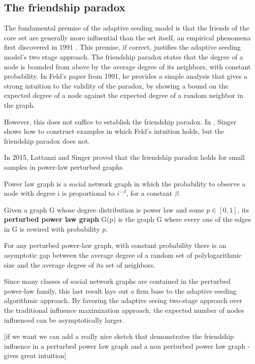 \subsection{The friendship paradox}

The fundamental premise of the adaptive seeding model is that the friends
 of the core set are generally more influential than the set itself, an empirical
 phenomena first discovered in 1991 \cite{feld1991your}.
 This premise, if correct, justifies the adaptive seeding model's two stage
 approach.
 The friendship paradox states that the degree of a node is bounded from
 above by the average degree of its neighbors, with constant probability.
 In Feld's paper from 1991, he provides a simple analysis that gives a strong
 intuition to the validity of the paradox, by showing a bound on the expected
 degree of a node against the expected degree of a random neighbor in the
 graph.

However, this does not suffice to establish the friendship paradox.
 In \cite{singer2016influence}, Singer shows how to construct examples in which Feld's intuition
 holds, but the friendship paradox does not.

In 2015, Lattanzi and Singer \cite{lattanzi2015power} proved that the friendship paradox holds for
 small samples in power-law perturbed graphs. 
 
\begin{definition}
Power law graph is a social network graph in which the probability to observe a node
 with degree i is proportional to $i^{-\beta}$, for a constant $\beta$.

\end{definition}

\begin{definition}

 Given a graph G whose degree distribution is power law and some $p\in [0,1]$, its \textbf{perturbed power law graph} G(p) is the graph G where every one of the edges in G is rewired with probability $p$.
\end{definition}

\begin{theorem}

 For any perturbed power-law graph, with constant probability there is an
 asymptotic gap between the average degree of a random set of polylogarithmic
 size and the average degree of its set of neighbors.
\cite{lattanzi2015power}
\end{theorem}


Since many classes of social network graphs are contained in the perturbed
 power-law family, this last result lays out a firm base to the adaptive
 seeding algorithmic approach.
 By favoring the adaptive seeing two-stage approach over the traditional
 influence maximization approach, the expected number of nodes influenced
 can be asymptotically larger.


[if we want we can add a really nice sketch that demonstrates the friendship
 influence in a perturbed power law graph and a non perturbed power law
 graph - gives great intuition]



